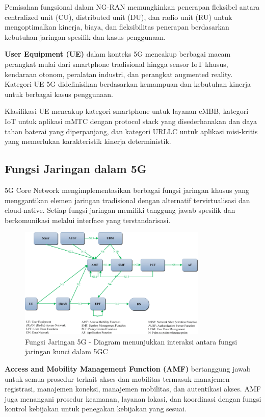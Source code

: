 Pemisahan fungsional dalam NG-RAN memungkinkan penerapan fleksibel antara centralized unit (CU), distributed unit (DU), dan radio unit (RU) untuk mengoptimalkan kinerja, biaya, dan fleksibilitas penerapan berdasarkan kebutuhan jaringan spesifik dan kasus penggunaan.

\textbf{User Equipment (UE)} dalam konteks 5G mencakup berbagai macam perangkat mulai dari smartphone tradisional hingga sensor IoT khusus, kendaraan otonom, peralatan industri, dan perangkat augmented reality. Kategori UE 5G didefinisikan berdasarkan kemampuan dan kebutuhan kinerja untuk berbagai kasus penggunaan.

Klasifikasi UE mencakup kategori smartphone untuk layanan eMBB, kategori IoT untuk aplikasi mMTC dengan protocol stack yang disederhanakan dan daya tahan baterai yang diperpanjang, dan kategori URLLC untuk aplikasi misi-kritis yang memerlukan karakteristik kinerja deterministik.

\subsection{Fungsi Jaringan dalam 5G}

5G Core Network mengimplementasikan berbagai fungsi jaringan khusus yang menggantikan elemen jaringan tradisional dengan alternatif tervirtualisasi dan cloud-native. Setiap fungsi jaringan memiliki tanggung jawab spesifik dan berkomunikasi melalui interface yang terstandarisasi.

\begin{figure}[htbp]
    \centering
    \includegraphics[width=0.8\textwidth]{assets/pics/bab3_8.png}
    \caption{Fungsi Jaringan 5G - Diagram menunjukkan interaksi antara fungsi jaringan kunci dalam 5GC}
    \label{fig:5g_network_functions}
\end{figure}

\textbf{Access and Mobility Management Function (AMF)} bertanggung jawab untuk semua prosedur terkait akses dan mobilitas termasuk manajemen registrasi, manajemen koneksi, manajemen mobilitas, dan autentikasi akses. AMF juga menangani prosedur keamanan, layanan lokasi, dan koordinasi dengan fungsi kontrol kebijakan untuk penegakan kebijakan yang sesuai.

